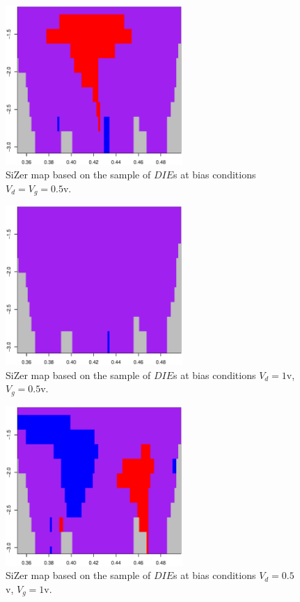 \documentclass[sn-mathphys]{sn-jnl}%
\theoremstyle{thmstyleone}%
\theoremstyle{thmstyletwo}%
\theoremstyle{thmstylethree}%
\begin{document}
\begin{figure}[ht]
	\centerline{\includegraphics [width=0.6\textwidth]{Fig12_sizerd05g05.eps}}
	\caption{SiZer map based on the sample of $DIE$s at bias conditions $V_d=V_g=0.5$v. }
	\label{fig:sizer1}
\end{figure}
\begin{figure}[ht]
	\centerline{\includegraphics [width=0.6\textwidth]{Fig13_sizerd1g05.eps}}
	\caption{SiZer map based on the sample of $DIE$s at bias conditions $V_d=1$v, $V_g=0.5$v.}
	\label{fig:sizer2}
\end{figure}
\begin{figure}[ht]
	\centerline{\includegraphics [width=0.6\textwidth]{Fig14_sizerd05g1.eps}}
	\caption{SiZer map based on the sample of $DIE$s at bias conditions $V_d=0.5$v, $V_g=1$v.}
	\label{fig:sizer3}
\end{figure}
\end{document}
